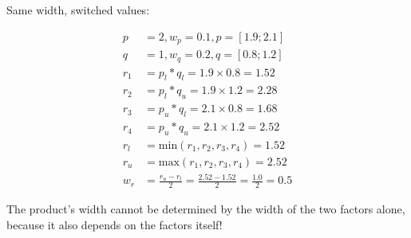 \documentclass[a4paper]{scrartcl}
\begin{document}
Same width, switched values:

\begin{align}
p &= 2, w_p = 0.1, p = [1.9;2.1] \\
q &= 1, w_q = 0.2, q = [0.8;1.2] \\
r_1 &= p_l * q_l = 1.9 \times 0.8 = 1.52 \\
r_2 &= p_l * q_u = 1.9 \times 1.2 = 2.28 \\
r_3 &= p_u * q_l = 2.1 \times 0.8 = 1.68 \\
r_4 &= p_u * q_u = 2.1 \times 1.2 = 2.52 \\
r_l &= \text{min}(r_1, r_2, r_3, r_4) = 1.52 \\
r_u &= \text{max}(r_1, r_2, r_3, r_4) = 2.52 \\
w_r &= \frac{r_u - r_l}{2} = \frac{2.52 - 1.52}{2} = \frac{1.0}{2} = 0.5
\end{align}

The product's width cannot be determined by the width of the two factors alone,
because it also depends on the factors itself!
\end{document}
